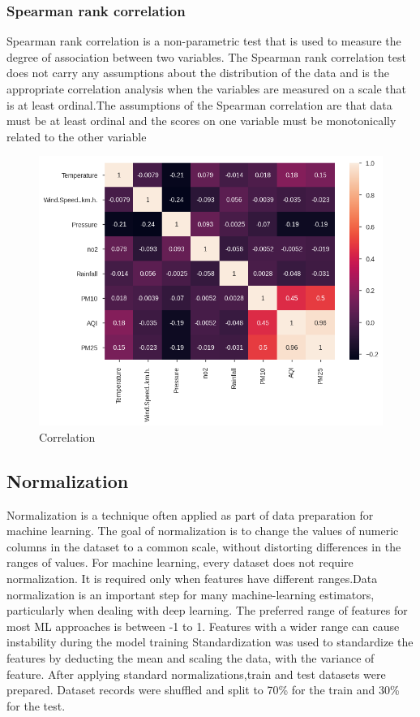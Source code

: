 \subsubsection{Spearman rank correlation}
Spearman rank correlation is a non-parametric test that is used to measure the degree of
association between two variables. The Spearman rank correlation test does not carry any
assumptions about the distribution of the data and is the appropriate correlation analysis
when the variables are measured on a scale that is at least ordinal.The assumptions of the Spearman correlation are that data must be at least ordinal
and the scores on one variable must be monotonically related to the other variable
\begin{figure}[h!]
\label{bc}
\centering
\includegraphics[width= 14 cm]{corr.png}
\caption { Correlation}
\end{figure}
\subsection{Normalization}
Normalization is a technique often applied as part of data preparation for machine learning. The goal of normalization is to change the values of numeric columns in the dataset
to a common scale, without distorting differences in the ranges of values. For machine
learning, every dataset does not require normalization. It is required only when features
have different ranges.Data normalization is an important step for many machine-learning
estimators, particularly when dealing with deep learning. The preferred range of features
for most ML approaches is between -1 to 1. Features with a wider range can cause instability during the model training Standardization was used to standardize the features
by deducting the mean and scaling the data, with the variance of feature. After applying standard normalizations,train and test datasets were prepared. Dataset records were
shuffled and split to 70\% for the train and 30\% for the test.
